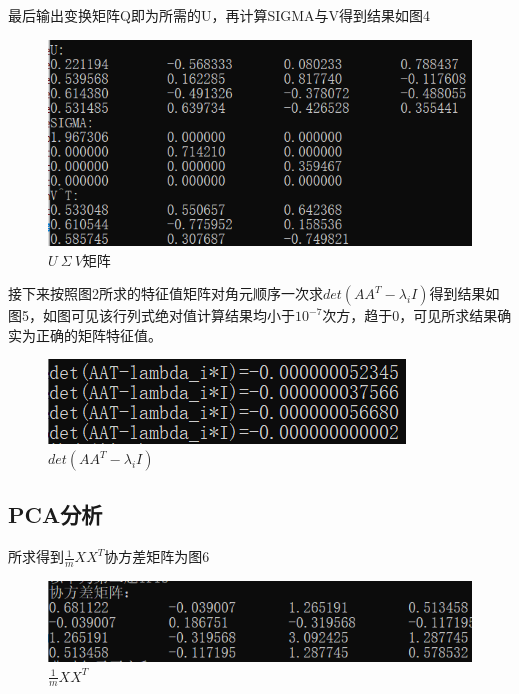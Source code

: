 \documentclass{article}
\begin{document}
最后输出变换矩阵Q即为所需的U，再计算SIGMA与V得到结果如图4
	\begin{figure}[!h]
	
	\centering
	\includegraphics[scale=1]{U_SIGMA_V}
	\caption{\heiti{} $U\ \Sigma \ V$矩阵}
	
\end{figure}


接下来按照图2所求的特征值矩阵对角元顺序一次求$ det(AA^T-\lambda_iI) $得到结果如图5，如图可见该行列式绝对值计算结果均小于$ 10^{-7} $次方，趋于0，可见所求结果确实为正确的矩阵特征值。
	\begin{figure}[!h]
	
	\centering
	\includegraphics[scale=1]{det}
	\caption{\heiti{}$ det(AA^T-\lambda_iI) $}
	
\end{figure}

	\subsection{PCA分析}
	所求得到$ \frac{1}{m}XX^T $协方差矩阵为图6
		\begin{figure}[!h]
		
		\centering
		\includegraphics[scale=1]{cov}
		\caption{\heiti{}$ \frac{1}{m}XX^T $}
		
	\end{figure}
\end{document}
